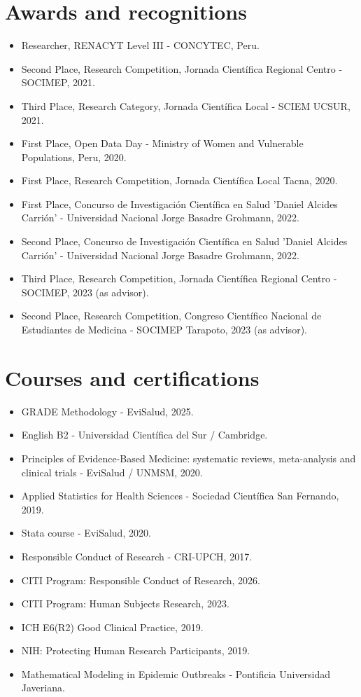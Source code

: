 \documentclass[11pt,a4paper]{article}
\begin{document}
\section*{Awards and recognitions}
\begin{itemize}[leftmargin=*,itemsep=4pt]
\item Researcher, RENACYT Level III - CONCYTEC, Peru.
\item Second Place, Research Competition, Jornada Científica Regional Centro - SOCIMEP, 2021.
\item Third Place, Research Category, Jornada Científica Local - SCIEM UCSUR, 2021.
\item First Place, Open Data Day - Ministry of Women and Vulnerable Populations, Peru, 2020.
\item First Place, Research Competition, Jornada Científica Local Tacna, 2020.
\item First Place, Concurso de Investigación Científica en Salud 'Daniel Alcides Carrión' - Universidad Nacional Jorge Basadre Grohmann, 2022.
\item Second Place, Concurso de Investigación Científica en Salud 'Daniel Alcides Carrión' - Universidad Nacional Jorge Basadre Grohmann, 2022.
\item Third Place, Research Competition, Jornada Científica Regional Centro - SOCIMEP, 2023 (as advisor).
\item Second Place, Research Competition, Congreso Científico Nacional de Estudiantes de Medicina - SOCIMEP Tarapoto, 2023 (as advisor).
\end{itemize}
\section*{Courses and certifications}
\begin{itemize}[leftmargin=*,itemsep=4pt]
\item GRADE Methodology - EviSalud, 2025.
\item English B2 - Universidad Científica del Sur / Cambridge.
\item Principles of Evidence-Based Medicine: systematic reviews, meta-analysis and clinical trials - EviSalud / UNMSM, 2020.
\item Applied Statistics for Health Sciences - Sociedad Científica San Fernando, 2019.
\item Stata course - EviSalud, 2020.
\item Responsible Conduct of Research - CRI-UPCH, 2017.
\item CITI Program: Responsible Conduct of Research, 2026.
\item CITI Program: Human Subjects Research, 2023.
\item ICH E6(R2) Good Clinical Practice, 2019.
\item NIH: Protecting Human Research Participants, 2019.
\item Mathematical Modeling in Epidemic Outbreaks - Pontificia Universidad Javeriana.
\end{itemize}
\end{document}
